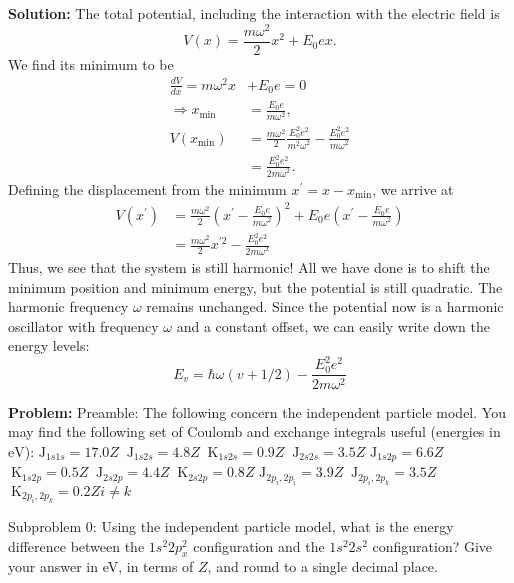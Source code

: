 \documentclass[10pt]{article}
\begin{document}
\textbf{Solution:}
The total potential, including the interaction with the electric field is
\[
V(x)=\frac{m \omega^{2}}{2} x^{2}+E_{0} e x .
\]
We find its minimum to be
\[
\begin{aligned}
\frac{d V}{d x}=m \omega^{2} x &+E_{0} e=0 \\
\Rightarrow x_{\min } &=\frac{E_{0} e}{m \omega^{2}}, \\
V\left(x_{\min }\right) &=\frac{m \omega^{2}}{2} \frac{E_{0}^{2} e^{2}}{m^{2} \omega^{2}}-\frac{E_{0}^{2} e^{2}}{m \omega^{2}} \\
&=\frac{E_{0}^{2} e^{2}}{2 m \omega^{2}} .
\end{aligned}
\]
Defining the displacement from the minimum $x^{\prime}=x-x_{\min }$, we arrive at
\[
\begin{aligned}
V\left(x^{\prime}\right) &=\frac{m \omega^{2}}{2}\left(x^{\prime}-\frac{E_{0} e}{m \omega^{2}}\right)^{2}+E_{0} e\left(x^{\prime}-\frac{E_{0} e}{m \omega^{2}}\right) \\
&=\frac{m \omega^{2}}{2} x^{\prime 2}-\frac{E_{0}^{2} e^{2}}{2 m \omega^{2}}
\end{aligned}
\]
Thus, we see that the system is still harmonic! All we have done is to shift the minimum position and minimum energy, but the potential is still quadratic. The harmonic frequency $\omega$ remains unchanged.
Since the potential now is a harmonic oscillator with frequency $\omega$ and a constant offset, we can easily write down the energy levels:
\[
E_{v}=\boxed{\hbar \omega(v+1 / 2)-\frac{E_{0}^{2} e^{2}}{2 m \omega^{2}}}
\]


\textbf{Problem:}
Preamble: The following concern the independent particle model. You may find the following set of Coulomb and exchange integrals useful (energies in $\mathrm{eV}$):
$\mathrm{J}_{1 s 1 s}=17.0 Z$ 
$\mathrm{~J}_{1 s 2 s}=4.8 Z$ 
$\mathrm{~K}_{1 s 2 s}=0.9 Z$ 
$\mathrm{~J}_{2 s 2 s}=3.5 Z$ 
$\mathrm{J}_{1 s 2 p}=6.6 Z$ 
$\mathrm{~K}_{1 s 2 p}=0.5 Z$ 
$\mathrm{~J}_{2 s 2 p}=4.4 Z$ 
$\mathrm{~K}_{2 s 2 p}=0.8 Z$ 
$\mathrm{J}_{2 p_{i}, 2 p_{i}}=3.9 Z$
$\mathrm{~J}_{2 p_{i}, 2 p_{k}}=3.5 Z$
$\mathrm{~K}_{2 p_{i}, 2 p_{k}}=0.2 Z i \neq k$ 

Subproblem 0: Using the independent particle model, what is the energy difference between the $1 s^{2} 2 p_{x}^{2}$ configuration and the $1 s^{2} 2 s^{2}$ configuration? Give your answer in eV, in terms of $Z$, and round to a single decimal place.
\end{document}
